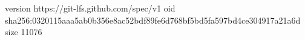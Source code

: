 version https://git-lfs.github.com/spec/v1
oid sha256:0320115aaa5ab0b356e8ac52bdf89fe6d768bf5bd5fa597bd4ce304917a21a6d
size 11076
